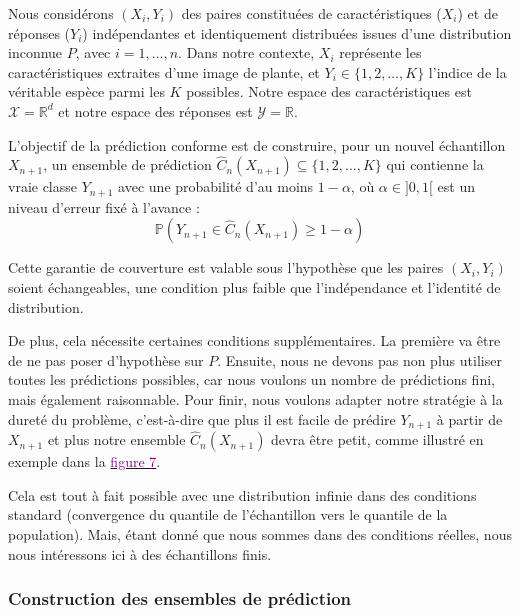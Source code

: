 \documentclass[a4paper,12pt]{article}
\begin{document}
Nous considérons $(X_i, Y_i)$ des paires constituées de caractéristiques ($X_i$) et de réponses ($Y_i$) indépendantes et identiquement distribuées issues d'une distribution inconnue $P$, avec $i = 1, \dots, n$. Dans notre contexte, $X_i$ représente les caractéristiques extraites d'une image de plante, et $Y_i \in \{1, 2, \dots, K\}$ l'indice de la véritable espèce parmi les $K$ possibles. Notre espace des caractéristiques est $\mathcal{X} = \mathbb R^d$ et notre espace des réponses est $\mathcal{Y} = \mathbb R$.

\vspace{0.2cm}

L'objectif de la prédiction conforme est de construire, pour un nouvel échantillon $X_{n+1}$, un ensemble de prédiction $\hat{C}_n(X_{n+1}) \subseteq \{1, 2, \dots, K\}$ qui contienne la vraie classe $Y_{n+1}$ avec une probabilité d'au moins $1 - \alpha$, où $\alpha \in ]0,1[$ est un niveau d'erreur fixé à l'avance : 
$$ \mathbb P(Y_{n+1} \in \hat C_n (X_{n+1}) \geq 1 - \alpha) $$

\vspace{0.2cm}

Cette garantie de couverture est valable sous l'hypothèse que les paires $(X_i, Y_i)$ soient échangeables, une condition plus faible que l'indépendance et l'identité de distribution.

\vspace{0.2cm}

De plus, cela nécessite certaines conditions supplémentaires. La première va être de ne pas poser d'hypothèse sur $P$. Ensuite, nous ne devons pas non plus utiliser toutes les prédictions possibles, car nous voulons un nombre de prédictions fini, mais également raisonnable. Pour finir, nous voulons adapter notre stratégie à la dureté du problème, c'est-à-dire que plus il est facile de prédire $Y_{n+1}$ à partir de $X_{n+1}$ et plus notre ensemble $\hat C_n(X_{n+1})$ devra être petit, comme illustré en exemple dans la \hyperref[fig:prediction_sets]{\textcolor{purple}{figure 7}}.

\vspace{0.2cm}

Cela est tout à fait possible avec une distribution infinie dans des conditions standard (convergence du quantile de l'échantillon vers le quantile de la population). Mais, étant donné que nous sommes dans des conditions réelles, nous nous intéressons ici à des échantillons finis.

\subsubsection{Construction des ensembles de prédiction}
\end{document}
